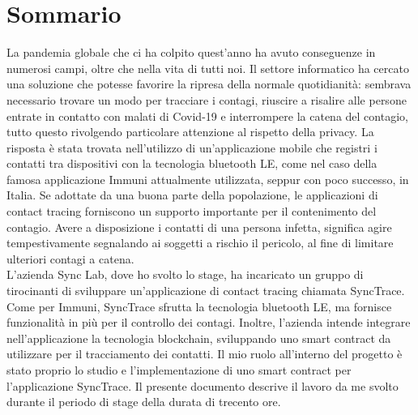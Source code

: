 
\cleardoublepage
{}
{}
\begingroup
\let\clearpage\relax
\let\cleardoublepage\relax
\let\cleardoublepage\relax

\chapter*{Sommario}

La pandemia globale che ci ha colpito quest'anno ha avuto conseguenze in numerosi campi, oltre che nella vita di tutti noi. Il settore informatico ha cercato una soluzione che potesse favorire la ripresa della normale quotidianità: sembrava necessario trovare un modo per tracciare i contagi, riuscire a risalire alle persone entrate in contatto con malati di Covid-19 e interrompere la catena del contagio, tutto questo rivolgendo particolare attenzione al rispetto della privacy.  
La risposta è stata trovata nell'utilizzo di un'applicazione mobile che registri i contatti tra dispositivi con la tecnologia bluetooth LE, come nel caso della famosa applicazione Immuni attualmente utilizzata, seppur con poco successo, in Italia. Se adottate da una buona parte della popolazione, le applicazioni di contact tracing forniscono un supporto importante per il contenimento del contagio. Avere a disposizione i contatti di una persona infetta, significa agire tempestivamente segnalando ai soggetti a rischio il pericolo, al fine di limitare ulteriori contagi a catena.\\
L'azienda Sync Lab, dove ho svolto lo stage, ha incaricato un gruppo di tirocinanti di sviluppare un'applicazione di contact tracing chiamata SyncTrace. Come per Immuni, SyncTrace sfrutta la tecnologia bluetooth LE, ma fornisce funzionalità in più per il controllo dei contagi. Inoltre, l'azienda intende integrare nell'applicazione la tecnologia blockchain, sviluppando uno smart contract da utilizzare per il tracciamento dei contatti. Il mio ruolo all'interno del progetto è stato proprio lo studio e l'implementazione di uno smart contract per l'applicazione SyncTrace.
Il presente documento descrive il lavoro da me svolto durante il periodo di stage della durata di trecento ore.

%
%

\endgroup			

\vfill

